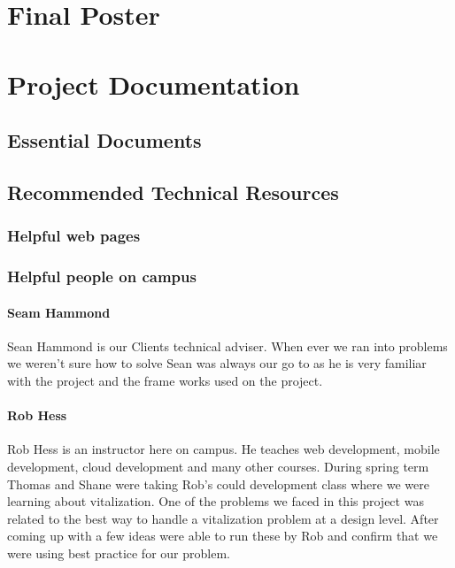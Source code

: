 \documentclass[onecolumn, draftclsnofoot,10pt, compsoc]{article}
\begin{document}
\section{Final Poster}

%
\section{Project Documentation}
    \subsection{Essential Documents}
    
    \subsection{Recommended Technical Resources}
        \subsubsection{Helpful web pages}
    
        \subsubsection{Helpful people on campus}
            \paragraph{Seam Hammond} Sean Hammond is our Clients technical adviser. When ever we ran into problems we weren't sure how to solve Sean was always our go to as he is very familiar with the project and the frame works used on the project.\\
            
            \paragraph{Rob Hess} Rob Hess is an instructor here on campus. He teaches web development, mobile development, cloud development and many other courses. During spring term Thomas and Shane were taking Rob's could development class where we were learning about vitalization. One of the problems we faced in this project was related to the best way to handle a vitalization problem at a design level. After coming up with a few ideas were able to run these by Rob and confirm that we were  using best practice for our problem.\\
            
\end{document}
